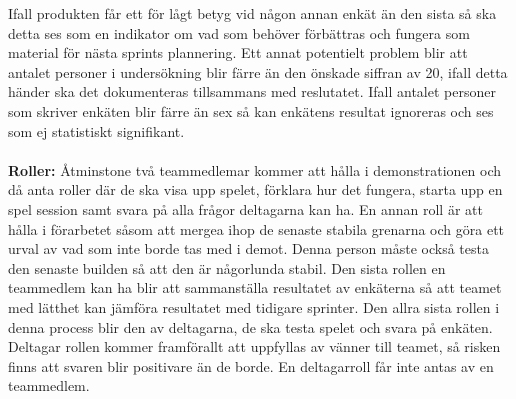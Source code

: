 \documentclass[10pt]{article}
\begin{document}
	Ifall produkten får ett för lågt betyg vid någon annan enkät än den sista så ska detta ses som en indikator om vad som behöver förbättras och fungera som material för nästa sprints plannering.
	Ett annat potentielt problem blir att antalet personer i undersökning blir färre än den önskade siffran av 20, ifall detta händer ska det dokumenteras tillsammans med reslutatet. Ifall antalet personer som skriver enkäten blir färre än sex så kan enkätens resultat ignoreras och ses som ej statistiskt signifikant.
	\\\\
	\textbf{Roller:} Åtminstone två teammedlemar kommer att hålla i demonstrationen och då anta roller där de ska visa upp spelet, förklara hur det fungera, starta upp en spel session samt svara på alla frågor deltagarna kan ha. En annan roll är att hålla i förarbetet såsom att mergea ihop de senaste stabila grenarna och göra ett urval av vad som inte borde tas med i demot. Denna person måste också testa den senaste builden så att den är någorlunda stabil. Den sista rollen en teammedlem kan ha blir att sammanställa resultatet av enkäterna så att teamet med lätthet kan jämföra resultatet med tidigare sprinter.	Den allra sista rollen i denna process blir den av deltagarna, de ska testa spelet och svara på enkäten. Deltagar rollen kommer framförallt att uppfyllas av vänner till teamet, så risken finns att svaren blir positivare än de borde. En deltagarroll får inte antas av en teammedlem.
	
	
\end{document}
